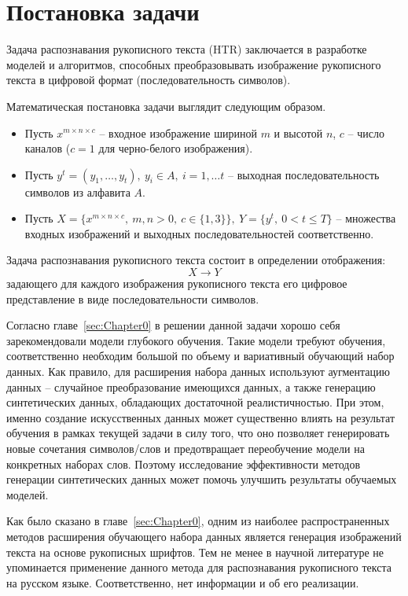 \section{Постановка задачи}
\label{sec:Chapter1} 

Задача распознавания рукописного текста (HTR) заключается в разработке моделей и алгоритмов,
способных преобразовывать изображение рукописного текста в цифровой формат (последовательность символов).

Математическая постановка задачи выглядит следующим образом.

\begin{itemize}
    \item[] Пусть $x^{m \times n \times c}$ -- входное изображение шириной $m$ и высотой $n$, $c$ -- число каналов ($c=1$ для черно-белого изображения).
    \item[] Пусть $y^t=(y_1,\dots,y_t),~y_i \in A,~i=1,\dots t$ -- выходная последовательность символов из алфавита $A$.
    \item[] Пусть $X=\{x^{m \times n \times c},~m,n>0,~c\in\{1,3\}\},~Y=\{y^t,~0<t\leqslant T\}$ -- множества входных изображений и выходных последовательностей соответственно.
\end{itemize}

Задача распознавания рукописного текста состоит в определении отображения:
\[ X \rightarrow Y \]
задающего для каждого изображения рукописного текста его цифровое представление в виде последовательности символов.

Согласно главе~\ref{sec:Chapter0} в решении данной задачи хорошо себя зарекомендовали модели глубокого обучения.
Такие модели требуют обучения, соответственно необходим большой по объему и вариативный обучающий набор данных.
Как правило, для расширения набора данных используют аугментацию данных -- случайное преобразование имеющихся данных,
а также генерацию синтетических данных, обладающих достаточной реалистичностью.
При этом, именно создание искусственных данных может существенно влиять на результат обучения в рамках текущей задачи в силу того,
что оно позволяет генерировать новые сочетания символов/слов и предотвращает переобучение модели на конкретных наборах слов.
Поэтому исследование эффективности методов генерации синтетических данных может помочь улучшить результаты обучаемых моделей.

Как было сказано в главе~\ref{sec:Chapter0}, одним из наиболее распространенных методов расширения обучающего набора данных
является генерация изображений текста на основе рукописных шрифтов.
Тем не менее в научной литературе не упоминается применение данного метода для распознавания рукописного текста на русском языке.
Соответственно, нет информации и об его реализации.

